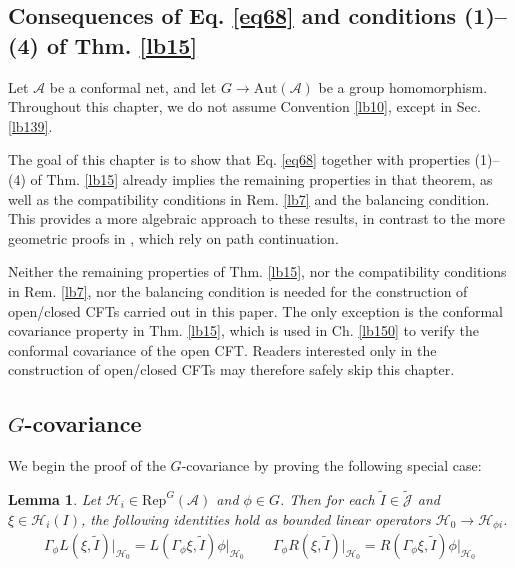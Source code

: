 \documentclass[11pt,b5paper,notitlepage]{article}
\theoremstyle{definition}
\theoremstyle{plain}
\newtheorem{lm}[df]{Lemma}
\newcommand{\wtd}{\widetilde}
\newcommand{\RepGA}{\mathrm{Rep}^G(\mathcal A)}
\newcommand{\Jtd}{\widetilde{\mathcal J}}
\newcommand{\Aut}{\mathrm{Aut}}
\newcommand{\MA}{\mathcal A}
\newcommand{\MH}{\mathcal H}
\numberwithin{equation}{section}
\begin{document}
\begin{appendices}

\section{Consequences of Eq. \eqref{eq68} and conditions (1)--(4) of Thm. \ref{lb15}}\label{lb140}



Let $\MA$ be a conformal net, and let $G\rightarrow\Aut(\MA)$ be a group homomorphism. Throughout this chapter, we do not assume Convention \ref{lb10}, except in Sec. \ref{lb139}.

The goal of this chapter is to show that Eq. \eqref{eq68} together with properties (1)--(4) of Thm. \ref{lb15} already implies the remaining properties in that theorem, as well as the compatibility conditions in Rem. \ref{lb7} and the balancing condition. This provides a more algebraic approach to these results, in contrast to the more geometric proofs in \cite{MS26a,MS26b}, which rely on path continuation. 


Neither the remaining properties of Thm. \ref{lb15}, nor the compatibility conditions in Rem. \ref{lb7}, nor the balancing condition is needed for the construction of open/closed CFTs carried out in this paper. The only exception is the conformal covariance property in Thm. \ref{lb15}, which is used in Ch. \ref{lb150} to verify the conformal covariance of the open CFT. Readers interested only in the construction of open/closed CFTs may therefore safely skip this chapter.





\subsection{$G$-covariance}\label{lb24}


We begin the proof of the $G$-covariance by proving the following special case:

\begin{lm}\label{lb23}
Let $\MH_i\in\RepGA$ and $\phi\in G$. Then for each $\wtd I\in\Jtd$ and $\xi\in\MH_i(I)$, the following identities hold as bounded linear operators $\MH_0\rightarrow\MH_{\phi i}$.
\begin{align}\label{eq13}
\Gamma_\phi L(\xi,\wtd I)\big|_{\MH_0}=L(\Gamma_\phi\xi,\wtd I)\phi\big|_{\MH_0}\qquad \Gamma_\phi R(\xi,\wtd I)\big|_{\MH_0}=R(\Gamma_\phi\xi,\wtd I)\phi\big|_{\MH_0}
\end{align}
\end{lm}


\end{appendices}
\end{document}
